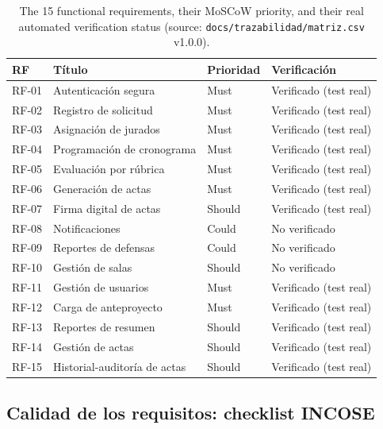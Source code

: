 \begin{table}[H]
\centering
\small
\begin{tabular}{p{1.2cm}p{5.5cm}p{1.6cm}p{2.5cm}}
\toprule
\textbf{RF} & \textbf{Título} & \textbf{Prioridad} & \textbf{Verificación} \\
\midrule
RF-01 & Autenticación segura & Must & Verificado (test real) \\
RF-02 & Registro de solicitud & Must & Verificado (test real) \\
RF-03 & Asignación de jurados & Must & Verificado (test real) \\
RF-04 & Programación de cronograma & Must & Verificado (test real) \\
RF-05 & Evaluación por rúbrica & Must & Verificado (test real) \\
RF-06 & Generación de actas & Must & Verificado (test real) \\
RF-07 & Firma digital de actas & Should & Verificado (test real) \\
RF-08 & Notificaciones & Could & No verificado \\
RF-09 & Reportes de defensas & Could & No verificado \\
RF-10 & Gestión de salas & Should & No verificado \\
RF-11 & Gestión de usuarios & Must & Verificado (test real) \\
RF-12 & Carga de anteproyecto & Must & Verificado (test real) \\
RF-13 & Reportes de resumen & Should & Verificado (test real) \\
RF-14 & Gestión de actas & Should & Verificado (test real) \\
RF-15 & Historial-auditoría de actas & Should & Verificado (test real) \\
\bottomrule
\end{tabular}
\caption{The 15 functional requirements, their MoSCoW priority, and their real automated
verification status (source: \texttt{docs/trazabilidad/matriz.csv} v1.0.0).}
\label{tab:rf-resumen}
\end{table}

\subsection{Calidad de los requisitos: checklist INCOSE}

